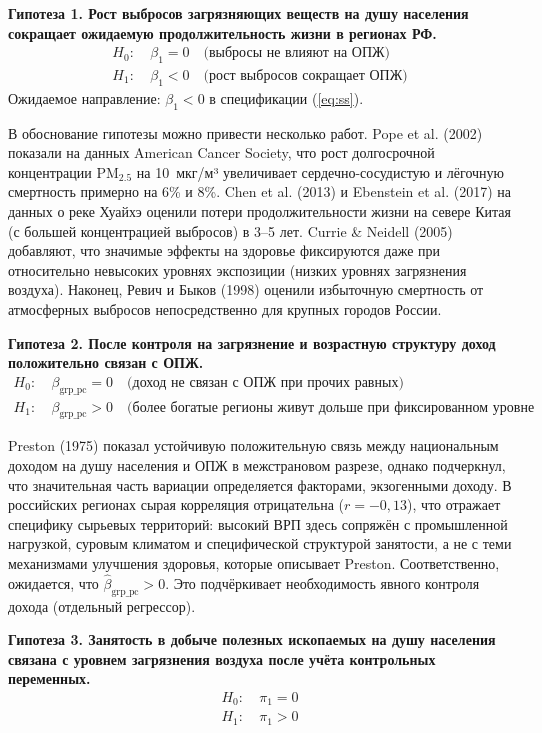 \documentclass[11pt,a4paper]{article}
\begin{document}
\textbf{Гипотеза 1. Рост выбросов загрязняющих веществ на душу населения сокращает ожидаемую продолжительность жизни в регионах РФ.}
\begin{align*}
H_0\colon\ & \beta_1 = 0 \quad \text{(выбросы не влияют на ОПЖ)}\\
H_1\colon\ & \beta_1 < 0 \quad \text{(рост выбросов сокращает ОПЖ)}
\end{align*}
Ожидаемое направление: $\beta_1 < 0$ в спецификации (\ref{eq:ss}).

В обоснование гипотезы можно привести несколько работ. Pope et al. (2002) показали на данных American Cancer Society, что рост долгосрочной концентрации $\text{PM}_{2.5}$ на 10~мкг/м³ увеличивает сердечно-сосудистую и лёгочную смертность примерно на 6\% и 8\%. Chen et al. (2013) и Ebenstein et al. (2017) на данных о реке Хуайхэ оценили потери продолжительности жизни на севере Китая (с большей концентрацией выбросов) в 3--5 лет. Currie \& Neidell (2005) добавляют, что значимые эффекты на здоровье фиксируются даже при относительно невысоких уровнях экспозиции (низких уровнях загрязнения воздуха). Наконец, Ревич и Быков (1998) оценили избыточную смертность от атмосферных выбросов непосредственно для крупных городов России.

\textbf{Гипотеза 2. После контроля на загрязнение и возрастную структуру доход положительно связан с ОПЖ.}
\begin{align*}
H_0\colon\ & \beta_{\text{grp\_pc}} = 0 \quad \text{(доход не связан с ОПЖ при прочих равных)}\\
H_1\colon\ & \beta_{\text{grp\_pc}} > 0 \quad \text{(более богатые регионы живут дольше при фиксированном уровне загрязнения)}
\end{align*}

Preston (1975) показал устойчивую положительную связь между национальным доходом на душу населения и ОПЖ в межстрановом разрезе, однако подчеркнул, что значительная часть вариации определяется факторами, экзогенными доходу. В российских регионах сырая корреляция отрицательна ($r = -0{,}13$), что отражает специфику сырьевых территорий: высокий ВРП здесь сопряжён с промышленной нагрузкой, суровым климатом и специфической структурой занятости, а не с теми механизмами улучшения здоровья, которые описывает Preston. Соответственно, ожидается, что $\hat\beta_{\text{grp\_pc}} > 0$. Это подчёркивает необходимость явного контроля дохода (отдельный регрессор).

\textbf{Гипотеза 3. Занятость в добыче полезных ископаемых на душу населения связана с уровнем загрязнения воздуха после учёта контрольных переменных.}
\begin{align*}
H_0\colon\ & \pi_1 = 0\\
H_1\colon\ & \pi_1 > 0
\end{align*}
\end{document}
